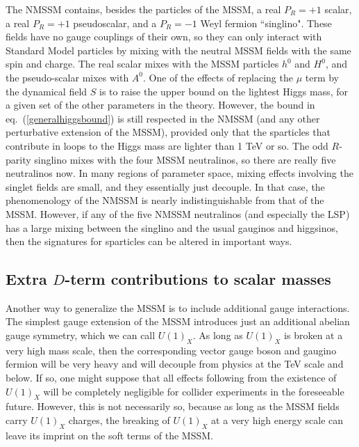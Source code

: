 The NMSSM contains, besides the particles of the MSSM, a real
$P_R=+1$ scalar, a real $P_R=+1$ pseudoscalar, and a $P_R=-1$ Weyl fermion
``singlino". These fields have no gauge couplings of their own,
so they can only interact with Standard Model particles by mixing
with the neutral MSSM fields with the same spin and charge.
The real scalar mixes with the MSSM particles $h^0$ and $H^0$, and
the
pseudo-scalar mixes with $A^0$.
One of the effects of replacing the $\mu$ term by the dynamical field $S$
is to raise the upper bound on the lightest Higgs mass, for a given set
of the other parameters in the theory.
However, the bound in
eq.~(\ref{generalhiggsbound}) is still respected in the NMSSM (and any
other perturbative extension of the MSSM), provided only that the
sparticles that contribute in loops to the Higgs mass are lighter
than 1 TeV or so.
The odd $R$-parity singlino mixes
with the four MSSM neutralinos, so there are really five neutralinos now.
In many regions of parameter space, mixing effects involving
the singlet
fields are small, and they essentially just decouple.
In that case, the phenomenology of the NMSSM is nearly 
indistinguishable from that of the MSSM.
However, if any of the five NMSSM neutralinos
(and especially the LSP)
has a large mixing between the  singlino
and the usual gauginos and higgsinos,
then the signatures for sparticles can be altered
in important ways.\cite{NMSSMpheno}

\subsection{Extra $D$-term contributions to scalar
masses}\label{subsec:variations.Dterms}

Another way to generalize the MSSM is to include additional gauge
interactions.
The simplest gauge extension of the MSSM introduces just an additional
abelian gauge symmetry, which we can call $U(1)_X$.
As long as $U(1)_X$ is broken at a very high mass scale, then the
corresponding vector gauge boson and gaugino fermion will be very heavy
and will decouple from physics
at the TeV scale and below. If so, one
might
suppose
that all effects following from the existence of $U(1)_X$ will be
completely negligible for collider experiments in the
foreseeable future. However, this is not necessarily so, because
as long as the MSSM fields carry $U(1)_X$ charges, the breaking of
$U(1)_X$ at a very high energy scale can leave its imprint on the soft
terms of the
MSSM.\cite{Dterms}


